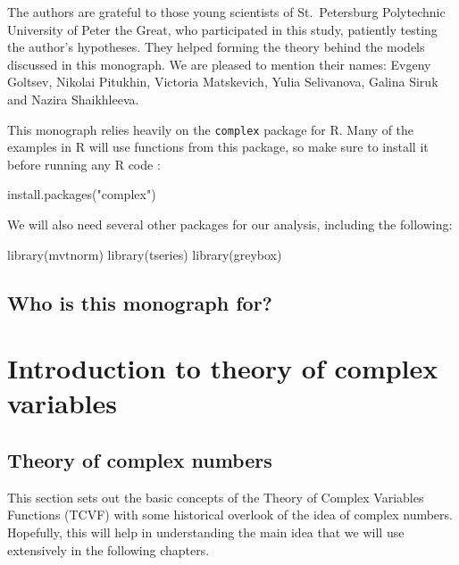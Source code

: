 \documentclass[
]{book}
\newenvironment{Shaded}{\begin{snugshade}}{\end{snugshade}}
\newcommand{\FunctionTok}[1]{\textcolor[rgb]{0.00,0.00,0.00}{#1}}
\newcommand{\NormalTok}[1]{#1}
\newcommand{\StringTok}[1]{\textcolor[rgb]{0.31,0.60,0.02}{#1}}
\begin{document}
The authors are grateful to those young scientists of St.~Petersburg Polytechnic University of Peter the Great, who participated in this study, patiently testing the author's hypotheses. They helped forming the theory behind the models discussed in this monograph. We are pleased to mention their names: Evgeny Goltsev, Nikolai Pitukhin, Victoria Matskevich, Yulia Selivanova, Galina Siruk and Nazira Shaikhleeva.

This monograph relies heavily on the \texttt{complex} package for R. Many of the examples in R will use functions from this package, so make sure to install it before running any R code \citep{R-complex}:

\begin{Shaded}
\begin{Highlighting}[]
\FunctionTok{install.packages}\NormalTok{(}\StringTok{"complex"}\NormalTok{)}
\end{Highlighting}
\end{Shaded}

We will also need several other packages for our analysis, including the following:

\begin{Shaded}
\begin{Highlighting}[]
\FunctionTok{library}\NormalTok{(mvtnorm)}
\FunctionTok{library}\NormalTok{(tseries)}
\FunctionTok{library}\NormalTok{(greybox)}
\end{Highlighting}
\end{Shaded}

\hypertarget{who-is-this-monograph-for}{%
\section*{Who is this monograph for?}\label{who-is-this-monograph-for}}

\hypertarget{intro}{%
\chapter{Introduction to theory of complex variables}\label{intro}}

\hypertarget{theoryOfComplexNumbers}{%
\section{Theory of complex numbers}\label{theoryOfComplexNumbers}}

This section sets out the basic concepts of the Theory of Complex Variables Functions (TCVF) with some historical overlook of the idea of complex numbers. Hopefully, this will help in understanding the main idea that we will use extensively in the following chapters.
\end{document}
